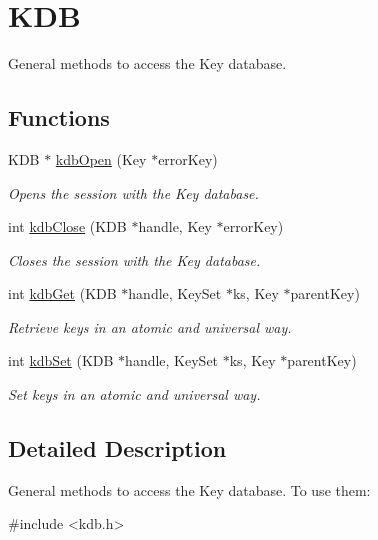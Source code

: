 \hypertarget{group__kdb}{\section{K\-D\-B}
\label{group__kdb}
}


General methods to access the Key database.  


\subsection*{Functions}
\begin{DoxyCompactItemize}
\item 
K\-D\-B $\ast$ \hyperlink{group__kdb_ga6808defe5870f328dd17910aacbdc6ca}{kdb\-Open} (Key $\ast$error\-Key)
\begin{DoxyCompactList}\small\item\em Opens the session with the Key database. \end{DoxyCompactList}\item 
int \hyperlink{group__kdb_gadb54dc9fda17ee07deb9444df745c96f}{kdb\-Close} (K\-D\-B $\ast$handle, Key $\ast$error\-Key)
\begin{DoxyCompactList}\small\item\em Closes the session with the Key database. \end{DoxyCompactList}\item 
int \hyperlink{group__kdb_ga28e385fd9cb7ccfe0b2f1ed2f62453a1}{kdb\-Get} (K\-D\-B $\ast$handle, Key\-Set $\ast$ks, Key $\ast$parent\-Key)
\begin{DoxyCompactList}\small\item\em Retrieve keys in an atomic and universal way. \end{DoxyCompactList}\item 
int \hyperlink{group__kdb_ga11436b058408f83d303ca5e996832bcf}{kdb\-Set} (K\-D\-B $\ast$handle, Key\-Set $\ast$ks, Key $\ast$parent\-Key)
\begin{DoxyCompactList}\small\item\em Set keys in an atomic and universal way. \end{DoxyCompactList}\end{DoxyCompactItemize}


\subsection{Detailed Description}
General methods to access the Key database. To use them\-: 
\begin{DoxyCode}
\textcolor{preprocessor}{#include <kdb.h>}
\end{DoxyCode}


